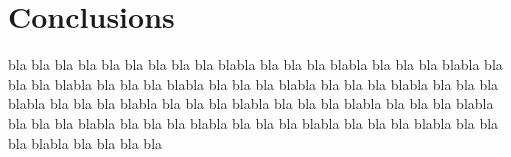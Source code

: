 \section*{Conclusions}
bla bla bla bla bla bla bla bla bla blabla bla bla bla blabla bla bla bla blabla bla bla bla blabla bla bla bla blabla bla bla bla blabla bla bla bla blabla bla bla bla blabla bla bla bla blabla bla bla bla blabla bla bla bla blabla bla bla bla blabla bla bla bla blabla bla bla bla blabla bla bla bla blabla bla bla bla blabla bla bla bla blabla bla bla bla bla